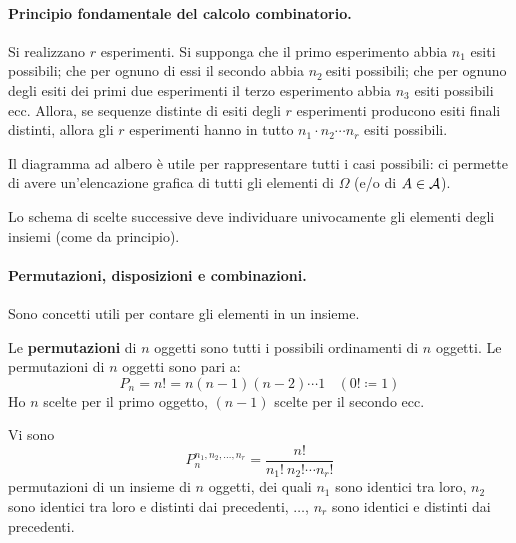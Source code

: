 \paragraph{Principio fondamentale del calcolo combinatorio.} Si realizzano $r$ esperimenti. Si supponga che il primo esperimento abbia $n_{1}$ esiti possibili; che per ognuno di essi il secondo abbia $n_{2} \ $esiti possibili; che per ognuno degli esiti dei primi due esperimenti il terzo esperimento abbia $n_{3}$ esiti possibili ecc. Allora, se sequenze distinte di esiti degli $r$ esperimenti producono esiti finali distinti, allora gli $r$ esperimenti hanno in tutto $n_{1} \cdot n_{2} \cdots n_{r}$ esiti possibili.

\begin{rem}
	Il diagramma ad albero è utile per rappresentare tutti i casi possibili: ci permette di avere un'elencazione grafica di tutti gli elementi di $\Omega $ (e/o di $A\in \mathcal{A}$).
\end{rem}

\begin{rem}
	Lo schema di scelte successive deve individuare univocamente gli elementi degli insiemi (come da principio).
\end{rem}

\paragraph{Permutazioni, disposizioni e combinazioni.}
Sono concetti utili per contare gli elementi in un insieme.

\begin{defn}
	Le \textbf{permutazioni} di $n$ oggetti sono tutti i possibili ordinamenti di $n$ oggetti. Le permutazioni di $n$ oggetti sono pari a:
	\begin{equation*}
		\boxed{P_{n} =n!=n(n-1)(n-2) \cdots 1} \ \ \ \ (0!\coloneqq 1)
	\end{equation*}
	Ho $n$ scelte per il primo oggetto, $(n-1)$ scelte per il secondo ecc.
\end{defn}

\begin{rem}
	Vi sono
	\begin{equation*}
		\boxed{P_{n}^{n_{1} ,n_{2} ,\dots ,n_{r}} =\frac{n!}{n_{1} !\ n_{2} !\cdots n_{r} !}}
	\end{equation*}
	permutazioni di un insieme di $n$ oggetti, dei quali $n_{1}$ sono identici tra loro, $n_{2}$ sono identici tra loro e distinti dai precedenti, $\dots $, $n_{r}$ sono identici e distinti dai precedenti.
\end{rem}

